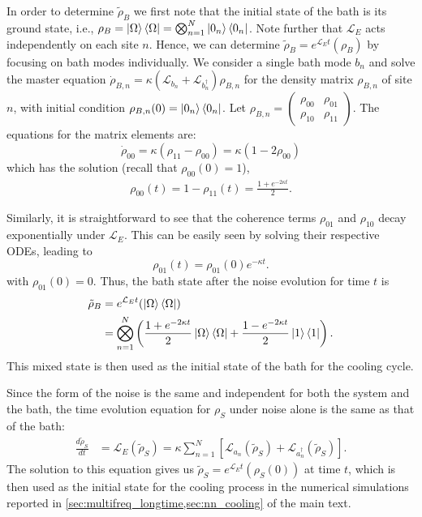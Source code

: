 In order to determine $\tilde{\rho}_B$ we first note that the initial state of the bath is its ground state, i.e., $\rho_B = \ket{\Omega}\bra{\Omega} = \bigotimes_{n=1}^N \ket{0_n}\bra{0_n}$. Note further that $\mathcal{L}_E$ acts independently on each site $n$. Hence, we can determine $\tilde{\rho}_B = e^{\mathcal{L}_E t}(\rho_B)$ by focusing on bath modes individually.
We consider a single bath mode $b_n$ and solve the master equation $\dot{\rho}_{B,n} = \kappa (\mathcal{L}_{b_n} + \mathcal{L}_{b_n^\dagger}) \rho_{B,n}$ for the density matrix $\rho_{B,n}$ of site $n$, with initial condition $\rho_{B,n}(0) = \ket{0_n}\bra{0_n}$. Let $\rho_{B,n} = \begin{pmatrix} \rho_{00} & \rho_{01} \\ \rho_{10} & \rho_{11} \end{pmatrix}$. The equations for the matrix elements are:
\begin{equation}
    \dot{\rho}_{00} = \kappa (\rho_{11} - \rho_{00})
    = \kappa (1 - 2\rho_{00})
\end{equation}
which has the solution (recall that $\rho_{00}(0) = 1$),
\begin{align}
    \rho_{00}(t) = 1-\rho_{11}(t) = \frac{1+e^{-2\kappa t}}{2}.
\end{align}


Similarly, it is straightforward to see that the coherence terms $\rho_{01}$ and $\rho_{10}$ decay exponentially under $\mathcal{L}_E$. This can be easily seen by solving their respective ODEs, leading to
\begin{equation}
    \rho_{01}(t)=\rho_{01}(0)e^{-\kappa t}.
\end{equation}
with $\rho_{01}(0)=0$.
Thus, the bath state after the noise evolution for time $t$ is
\begin{align}
    \tilde{\rho}_B &= e^{\mathcal{L}_E t}(\ket{\Omega}\bra{\Omega})\nonumber\\
                   &= \bigotimes_{n=1}^N \left( \frac{1+e^{-2\kappa t}}{2}\ket{\Omega}\bra{\Omega}+\frac{1-e^{-2\kappa t}}{2}\ket{1}\bra{1} \right).
\end{align}
This mixed state is then used as the initial state of the bath for the cooling cycle.

Since the form of the noise is the same and independent for both the system and the bath, the time evolution equation for $\rho_S$ under noise alone is the same as that of the bath:
\begin{align}
    \frac{d\tilde{\rho}_S}{dt} &= \mathcal{L}_E(\tilde{\rho}_S) = \kappa\sum_{n=1}^N \left[\mathcal{L}_{a_n}(\tilde{\rho}_S) + \mathcal{L}_{a_n^\dagger}(\tilde{\rho}_S)\right].
\end{align}
The solution to this equation gives us $\tilde{\rho}_S = e^{\mathcal{L}_E t}(\rho_S(0))$ at time $t$, which is then used as the initial state for the cooling process in the numerical simulations reported in \cref{sec:multifreq_longtime,sec:nn_cooling} of the main text.

